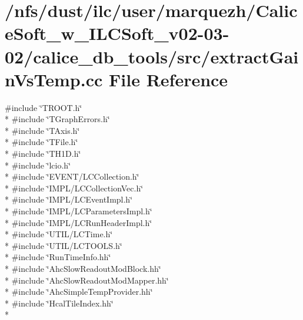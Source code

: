 \section{/nfs/dust/ilc/user/marquezh/\-Calice\-Soft\-\_\-w\-\_\-\-I\-L\-C\-Soft\-\_\-v02-\/03-\/02/calice\-\_\-db\-\_\-tools/src/extract\-Gain\-Vs\-Temp.cc File Reference}
\label{extractGainVsTemp_8cc}
{\ttfamily \#include \char`\"{}T\-R\-O\-O\-T.\-h\char`\"{}}\\*
{\ttfamily \#include \char`\"{}T\-Graph\-Errors.\-h\char`\"{}}\\*
{\ttfamily \#include \char`\"{}T\-Axis.\-h\char`\"{}}\\*
{\ttfamily \#include \char`\"{}T\-File.\-h\char`\"{}}\\*
{\ttfamily \#include \char`\"{}T\-H1\-D.\-h\char`\"{}}\\*
{\ttfamily \#include \char`\"{}lcio.\-h\char`\"{}}\\*
{\ttfamily \#include \char`\"{}E\-V\-E\-N\-T/\-L\-C\-Collection.\-h\char`\"{}}\\*
{\ttfamily \#include \char`\"{}I\-M\-P\-L/\-L\-C\-Collection\-Vec.\-h\char`\"{}}\\*
{\ttfamily \#include \char`\"{}I\-M\-P\-L/\-L\-C\-Event\-Impl.\-h\char`\"{}}\\*
{\ttfamily \#include \char`\"{}I\-M\-P\-L/\-L\-C\-Parameters\-Impl.\-h\char`\"{}}\\*
{\ttfamily \#include \char`\"{}I\-M\-P\-L/\-L\-C\-Run\-Header\-Impl.\-h\char`\"{}}\\*
{\ttfamily \#include \char`\"{}U\-T\-I\-L/\-L\-C\-Time.\-h\char`\"{}}\\*
{\ttfamily \#include \char`\"{}U\-T\-I\-L/\-L\-C\-T\-O\-O\-L\-S.\-h\char`\"{}}\\*
{\ttfamily \#include \char`\"{}Run\-Time\-Info.\-hh\char`\"{}}\\*
{\ttfamily \#include \char`\"{}Ahc\-Slow\-Readout\-Mod\-Block.\-hh\char`\"{}}\\*
{\ttfamily \#include \char`\"{}Ahc\-Slow\-Readout\-Mod\-Mapper.\-hh\char`\"{}}\\*
{\ttfamily \#include \char`\"{}Ahc\-Simple\-Temp\-Provider.\-hh\char`\"{}}\\*
{\ttfamily \#include \char`\"{}Hcal\-Tile\-Index.\-hh\char`\"{}}\\*
